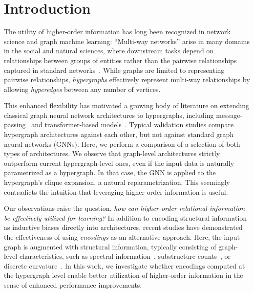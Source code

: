 \section{Introduction}
\label{intro}
The utility of higher-order information has long been recognized in network science and graph machine learning: ``Multi-way networks'' arise in many domains in the social and natural sciences, where downstream tasks depend on relationships between groups of entities rather than the pairwise relationships captured in standard networks~\citep{bick2023higher,benson2021higher,schaub2021signal}.
While graphs are limited to representing pairwise relationships, \emph{hypergraphs} effectively represent multi-way relationships by allowing \emph{hyperedges} between any number of vertices.

This enhanced flexibility has motivated a growing body of literature on extending classical graph neural network architectures to hypergraphs, including message-passing~\citep{huang2021unignn} and transformer-based models~\citep{liu2024hypergraph}. Typical validation studies compare hypergraph architectures against each other, but not against standard graph neural networks (GNNs). Here, we perform a comparison of a selection of both types of architectures. We observe that graph-level architectures strictly outperform current hypergraph-level ones, even if the input data is naturally parametrized as a hypergraph. In that case, the GNN is applied to the hypergraph’s clique expansion, a natural reparametrization. This seemingly contradicts the intuition that leveraging higher-order information is useful.

Our observations raise the question, \emph{how can higher-order relational information be effectively utilized for learning?} In addition to encoding structural information as inductive biases directly into architectures, recent studies have demonstrated the effectiveness of using \emph{encodings} as an alternative approach. Here, the input graph is augmented with structural information, typically consisting of graph-level characteristics, such as spectral information~\citep{dwivedi2023benchmarking}, substructure counts~\citep{zhao2021stars}, or discrete curvature~\citep{fesser2023effective}. In this work, we investigate whether encodings computed at the hypergraph level enable better utilization of higher-order information in the sense of enhanced performance improvements.

